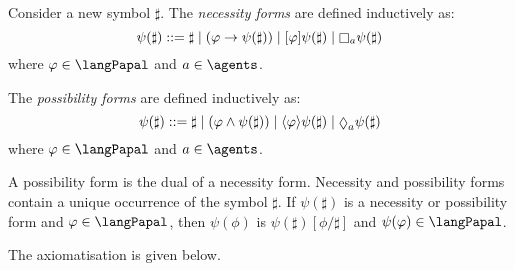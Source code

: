 \begin{definition}
    Consider a new symbol $\sharp$. The {\em necessity forms} are defined inductively as: $$\psi(\sharp) ::= \sharp \mid (\phi \implies \psi(\sharp)) \mid \announceA{\phi} \psi(\sharp) \mid \knows[\agentA] \psi(\sharp)$$ where $\phi \in \langPapal$ and $\agentA \in \agents$.

    The {\em possibility forms} are defined inductively as: $$\psi(\sharp) ::= \sharp \mid (\phi \land \psi(\sharp)) \mid \announceE{\phi} \psi(\sharp) \mid \suspects[\agentA] \psi(\sharp)$$ where $\phi \in \langPapal$ and $\agentA \in \agents$.
\end{definition}

A possibility form is the dual of a necessity form. Necessity and possibility forms contain a unique occurrence of the symbol $\sharp$. If $\psi(\sharp)$ is a necessity or possibility form and $\phi \in \langPapal$, then $\psi(\phi)$ is $\psi(\sharp)[\phi/\sharp]$ and $\psi(\phi) \in \langPapal$.

The axiomatisation \axiomPapalS{} is given below.

